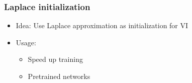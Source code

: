 \documentclass{beamer}
\begin{document}
        \begin{frame}
            \frametitle{Laplace initialization}
            \begin{itemize}
                \item Idea: Use Laplace approximation as initialization for VI
                \item Usage: \begin{itemize}
                    \item Speed up training
                    \item Pretrained networks
                \end{itemize}
            \end{itemize}
        \end{frame}
        
        



\end{document}
